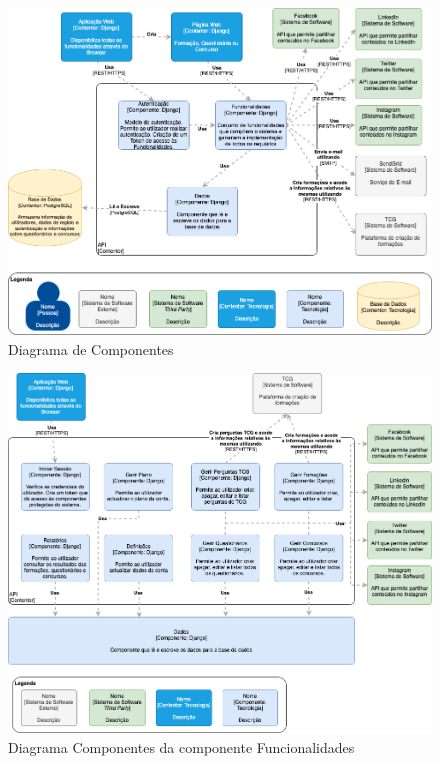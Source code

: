 \begin{figure}[ht!]
	\begin{center}
		\includegraphics[width=1\textwidth]{img/arq/diagrama-componentes}
		\caption{Diagrama de Componentes}
		\label{fig:arq-componentes}
	\end{center}
\end{figure}

\begin{figure}[ht!]
	\begin{center}
		\includegraphics[width=1\textwidth]{img/arq/diagrama-componentes1}
		\caption{Diagrama Componentes da componente Funcionalidades}
		\label{fig:arq-componentes1}
	\end{center}
\end{figure}

